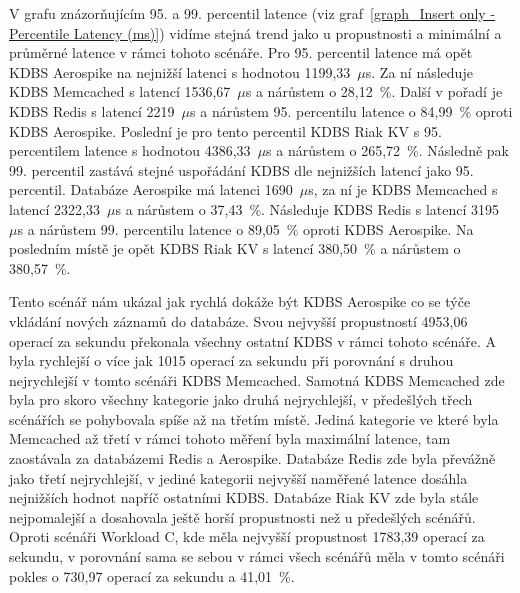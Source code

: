 \documentclass[czech,master,dept460,male,csharp,cpdeclaration]{diploma}
\begin{document}
	V grafu znázorňujícím 95. a 99. percentil latence (viz graf~\ref{graph_Insert only - Percentile Latency (ms)}) vidíme stejná trend jako u propustnosti a minimální a průměrné latence v rámci tohoto scénáře. Pro 95. percentil latence má opět KDBS Aerospike na nejnižší latenci s hodnotou 1199,33~$\mu$s. Za ní následuje KDBS Memcached s latencí 1536,67~$\mu$s a nárůstem o 28,12~\%. Další v pořadí je KDBS Redis s latencí 2219~$\mu$s a nárůstem 95. percentilu latence o 84,99~\% oproti KDBS Aerospike. Poslední je pro tento percentil KDBS Riak KV s 95. percentilem latence s hodnotou 4386,33~$\mu$s a nárůstem o 265,72~\%. Následně pak 99. percentil zastává stejné uspořádání KDBS dle nejnižších latencí jako 95. percentil. Databáze Aerospike má latenci 1690~$\mu$s, za ní je KDBS Memcached s latencí 2322,33~$\mu$s a nárůstem o 37,43~\%. Následuje KDBS Redis s latencí 3195~$\mu$s a nárůstem 99. percentilu latence o 89,05~\% oproti KDBS Aerospike. Na posledním místě je opět KDBS Riak KV s latencí 380,50~\% a nárůstem o 380,57~\%.
	
	Tento scénář nám ukázal jak rychlá dokáže být KDBS Aerospike co se týče vkládání nových záznamů do databáze. Svou nejvyšší propustností 4953,06 operací za sekundu překonala všechny ostatní KDBS v rámci tohoto scénáře. A byla rychlejší o více jak 1015 operací za sekundu při porovnání s druhou nejrychlejší v tomto scénáři KDBS Memcached. Samotná KDBS Memcached zde byla pro skoro všechny kategorie jako druhá nejrychlejší, v předešlých třech scénářích se pohybovala spíše až na třetím místě. Jediná kategorie ve které byla Memcached až třetí v rámci tohoto měření byla maximální latence, tam zaostávala za databázemi Redis a Aerospike. Databáze Redis zde byla převážně jako třetí nejrychlejší, v jediné kategorii nejvyšší naměřené latence dosáhla nejnižších hodnot napříč ostatními KDBS. Databáze Riak KV zde byla stále nejpomalejší a dosahovala ještě horší propustnosti než u předešlých scénářů. Oproti scénáři Workload C, kde měla nejvyšší propustnost 1783,39 operací za sekundu, v porovnání sama se sebou v rámci všech scénářů měla v tomto scénáři pokles o 730,97 operací za sekundu a 41,01~\%.
	
\end{document}
